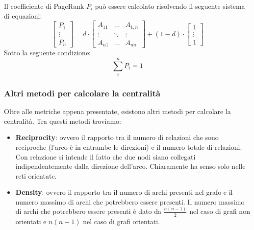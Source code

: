 Il coefficiente di PageRank $P_i$ può essere calcolato risolvendo il seguente
sistema di equazioni:
\begin{equation}
    \left[
        \begin{array}{c}
            P_1    \\
            \vdots \\
            P_n
        \end{array}
        \right] = d \cdot \left[
        \begin{array}{ccc}
            A_{11} & \dots  & A_{1, n} \\
            \vdots & \ddots & \vdots   \\
            A_{n1} & \dots  & A_{nn}
        \end{array}
        \right] + (1 - d) \cdot \left[
        \begin{array}{c}
            1      \\
            \vdots \\
            1
        \end{array} \right]
\end{equation}
Sotto la seguente condizione:
\begin{equation*}
    \sum_{i}^n P_i = 1
\end{equation*}
\subsubsection{Altri metodi per calcolare la centralità}
Oltre alle metriche appena presentate, esistono altri metodi per calcolare la
centralità. Tra questi metodi troviamo:
\begin{itemize}
    \item \textbf{Reciprocity}: ovvero il rapporto tra il numero di relazioni che 
            sono reciproche (l'arco è in entrambe le direzioni) e il numero totale 
            di relazioni. Con relazione si intende il fatto che due nodi siano
            collegati indipendentemente dalla direzione dell'arco. Chiaramente ha 
            senso solo nelle reti orientate.
    \item \textbf{Density}: ovvero il rapporto tra il numero di archi presenti nel 
            grafo e il numero massimo di archi che potrebbero essere presenti. 
            Il numero massimo di archi che potrebbero essere presenti è dato da
            $\frac{n(n-1)}{2}$ nel caso di grafi non orientati e $n(n-1)$ nel caso
            di grafi orientati.
\end{itemize}

